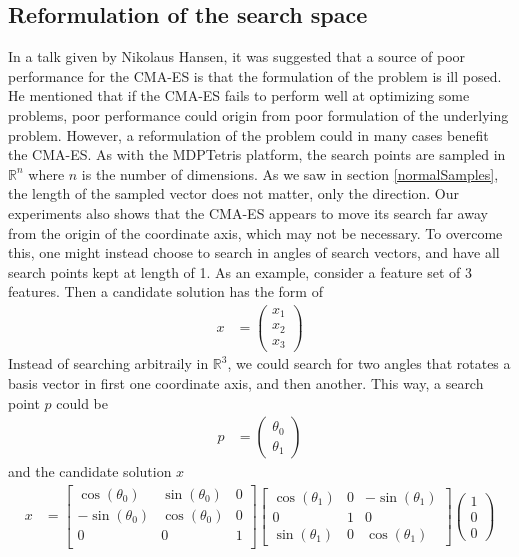 \subsection{Reformulation of the search space}

In a talk given by Nikolaus Hansen, it was suggested that a source of poor performance 
for the CMA-ES is that the formulation of the problem is ill posed.
He mentioned that if the CMA-ES fails to perform well at optimizing some problems, poor 
performance could origin from poor formulation of the underlying problem. 
However, a reformulation of the problem could in many cases benefit the CMA-ES. As with the 
MDPTetris platform, the search points are sampled in $\mathbb{R}^n$ where 
$n$ is the number of dimensions. As we saw in section \ref{normalSamples}, the length 
of the sampled vector does not matter, only the direction. Our experiments also shows that 
the CMA-ES appears to move its search far away from the origin of the coordinate axis,
which may not be necessary. To overcome this, one might instead choose to search in angles 
of search vectors, and have all search points kept at length of 1. As an example, 
consider a feature set of 3 features. Then a candidate solution has the form of
\begin{align}
x &= \begin{pmatrix}
x_1 \\
x_2 \\
x_3
\end{pmatrix}
\end{align}
Instead of searching arbitraily in $\mathbb{R}^3$, we could search for two angles that rotates
a basis vector in first one coordinate axis, and then another. This way, a search point $p$ 
could be
\begin{align}
p &= \begin{pmatrix}
\theta_0\\
\theta_1
\end{pmatrix}
\end{align}
and the candidate solution $x$
\begin{align}
x &= 
\begin{bmatrix}
\cos\left( \theta_0 \right) & \sin\left( \theta_0 \right) & 0\\
-\sin\left( \theta_0 \right) & \cos\left( \theta_0 \right) & 0\\
0 & 0 & 1\\
\end{bmatrix}
\begin{bmatrix}
\cos\left( \theta_1 \right) & 0 & -\sin\left( \theta_1 \right)\\
0 & 1 & 0\\
\sin\left( \theta_1 \right) & 0 & \cos\left( \theta_1 \right)
\end{bmatrix}
\begin{pmatrix}
1\\
0\\
0
\end{pmatrix}
\end{align}
